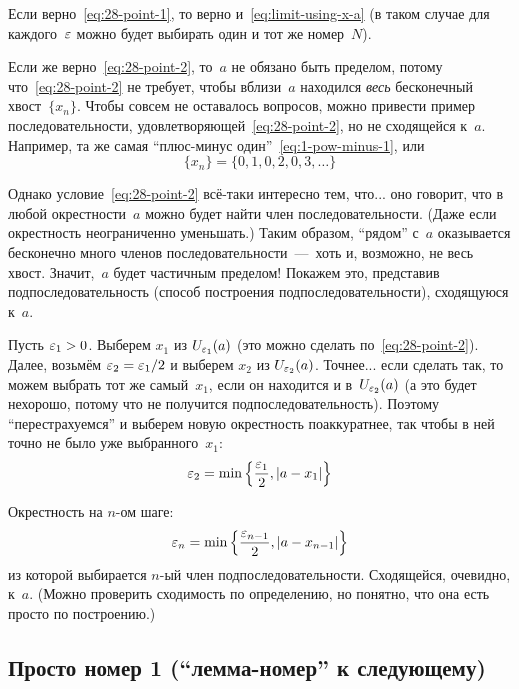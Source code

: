 \documentclass[a4paper,12pt]{article}
\begin{document}
  \begin{solution}
    Если верно~\eqref{eq:28-point-1}, то верно и~\eqref{eq:limit-using-x-a} (в таком случае для каждого~$\varepsilon$ можно будет выбирать один и тот же номер~$N$).
    
    Если же верно~\eqref{eq:28-point-2}, то~$a$ не обязано быть пределом, потому что~\eqref{eq:28-point-2} не требует, чтобы вблизи~$a$ находился \emph{весь} бесконечный хвост~$\{x_n\}$.
    Чтобы совсем не оставалось вопросов, можно привести пример последовательности, удовлетворяющей~\eqref{eq:28-point-2}, но не сходящейся к~$a$.
    Например, та же самая ``плюс-минус один''~\eqref{eq:1-pow-minus-1}, или
    \[
      \{x_n\} = \{0, 1, 0, 2, 0, 3, \ldots\}
    \]
    
    Однако условие~\eqref{eq:28-point-2} всё-таки интересно тем, что... оно говорит, что в любой окрестности~$a$ можно будет найти член последовательности.
    (Даже если окрестность неограниченно уменьшать.)
    Таким образом, ``рядом'' с~$a$ оказывается бесконечно много членов последовательности~---~хоть и, возможно, не весь хвост.
    Значит,~$a$ будет частичным пределом!
    Покажем это, представив подпоследовательность (способ построения подпоследовательности), сходящуюся к~$a$.
    
    Пусть $\eps_1 \hm> 0$.
    Выберем $x_1$ из $U_{\varepsilon_1}(a)$ (это можно сделать по~\eqref{eq:28-point-2}).
    Далее, возьмём $\eps_2 \hm= \eps_1/2$ и выберем $x_2$ из $U_{\varepsilon_2}(a)$.
    Точнее... если сделать так, то можем выбрать тот же самый~$x_1$, если он находится и в~$U_{\varepsilon_2}(a)$ (а это будет нехорошо, потому что не получится подпоследовательность).
    Поэтому ``перестрахуемся'' и выберем новую окрестность поаккуратнее, так чтобы в ней точно не было уже выбранного~$x_1$:
    \[
      \varepsilon_2 = \min\left\{\frac{\varepsilon_1}{2}, \left|a - x_1\right|\right\}
    \]
    
    Окрестность на $n$-ом шаге:
    \[
      \varepsilon_n = \min\left\{\frac{\varepsilon_{n - 1}}{2}, \left|a - x_{n - 1}\right|\right\}
    \]
    из которой выбирается $n$-ый член подпоследовательности.
    Сходящейся, очевидно, к~$a$.
    (Можно проверить сходимость по определению, но понятно, что она есть просто по построению.)
 
  \end{solution}
  
  
  \subsection{Просто номер 1 (``лемма-номер'' к следующему)}\label{sec:simple-no-1}
  
\end{document}
